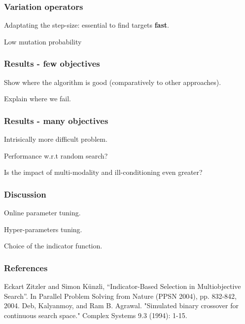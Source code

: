 \documentclass[12pt]{beamer}
\begin{document}
    \begin{frame}
    \frametitle{Variation operators}
    Adaptating the step-size: essential to find targets \textbf{fast}.
    
    Low mutation probability
  \end{frame}
  
      \begin{frame}
    \frametitle{Results - few objectives}
    Show where the algorithm is good (comparatively to other approaches).
    
    Explain where we fail.
  \end{frame}
  
        \begin{frame}
    \frametitle{Results - many objectives}
    Intrisically more difficult problem.
    
    Performance w.r.t random search?
    
    Is the impact of multi-modality and ill-conditioning even greater?
  \end{frame}
  
      \begin{frame}
    \frametitle{Discussion}
    Online parameter tuning.
    
    Hyper-parameters tuning.
    
    Choice of the indicator function.
  \end{frame}
  
  \begin{frame}
  \end{frame}
  
    
  
\begin{frame}[allowframebreaks]
  \frametitle<presentation>{References}    
\begin{thebibliography}{}
\beamertemplatearticlebibitems
{} Eckart Zitzler and Simon Künzli, “Indicator-Based Selection in Multiobjective Search”. In Parallel Problem Solving from Nature (PPSN 2004), pp. 832-842, 2004.
 Deb, Kalyanmoy, and Ram B. Agrawal. "Simulated binary crossover for continuous search space." Complex Systems 9.3 (1994): 1-15.
\end{thebibliography}
\end{frame}
\end{document}
